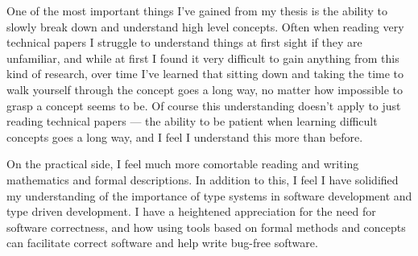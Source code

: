 One of the most important things I've gained from my thesis is the ability to slowly break down and understand high level
concepts. Often when reading very technical papers I struggle to understand things at first sight if they are unfamiliar,
and while at first I found it very difficult to gain anything from this kind of research, over time I've learned that
sitting down and taking the time to walk yourself through the concept goes a long way, no matter how impossible to grasp
a concept seems to be. Of course this understanding doesn't apply to just reading technical papers --- the ability to
be patient when learning difficult concepts goes a long way, and I feel I understand this more than before.

On the practical side, I feel much more comortable reading and writing mathematics and formal descriptions. In addition to
this, I feel I have solidified my understanding of the importance of type systems in software development and
type driven development. I have a heightened appreciation for the need for software correctness, and how using
tools based on formal methods and concepts can facilitate correct software and help write bug-free software.